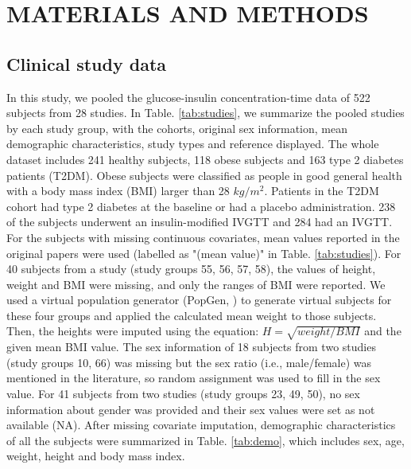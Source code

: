 \documentclass[utf8]{frontiersSCNS} %
\begin{document}
\section{MATERIALS AND METHODS}

\subsection{Clinical study data}
In this study, we pooled the glucose-insulin concentration-time data of 522 subjects from 28 studies. In Table. \ref{tab:studies}, we summarize the pooled studies by each study group, with the cohorts, original sex information, mean demographic characteristics, study types and reference displayed. The whole dataset includes 241 healthy subjects, 118 obese subjects and 163 type 2 diabetes patients (T2DM). Obese subjects were classified as people in good general health with a body mass index (BMI) larger than 28 $kg/m^2$. Patients in the T2DM cohort had type 2 diabetes at the baseline or had a placebo administration. 238 of the subjects underwent an insulin-modified IVGTT and 284 had an IVGTT. For the subjects with missing continuous covariates, mean values reported in the original papers were used (labelled as "(mean value)" in Table. \ref{tab:studies}). For 40 subjects from a study (study groups 55, 56, 57, 58), the values of height, weight and BMI were missing, and only the ranges of BMI were reported. We used a virtual population generator (PopGen, \cite{McNally2015}) to generate virtual subjects for these four groups and applied the calculated mean weight to those subjects. Then, the heights were imputed using the equation: $H=\sqrt{weight/BMI}$ and the given mean BMI value. The sex information of 18 subjects from two studies (study groups 10, 66) was missing but the sex ratio (i.e., male/female) was mentioned in the literature, so random assignment was used to fill in the sex value. For 41 subjects from two studies (study groups 23, 49, 50), no sex information about gender was provided and their sex values were set as not available (NA). After missing covariate imputation, demographic characteristics of all the subjects were summarized in Table. \ref{tab:demo}, which includes sex, age, weight, height and body mass index. 
\end{document}
